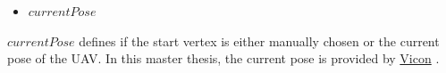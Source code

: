 \begin{itemize}
  \item $currentPose$
\end{itemize}


$currentPose$ defines if the start vertex is either manually chosen or the current pose of the UAV. In this master thesis, the current pose is provided by \href{http://www.vicon.com/}{Vicon} \cite{Vicon}.







%
%
%
%
%
%
%
%
%

